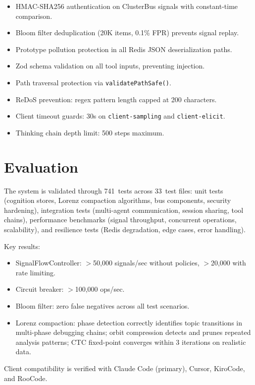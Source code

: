 \documentclass[journal,10pt]{IEEEtran}
\newcommand{\code}[1]{\texttt{#1}}
\begin{document}
\begin{itemize}[nosep]
\item HMAC-SHA256 authentication on ClusterBus signals with constant-time comparison.
\item Bloom filter deduplication (20K items, 0.1\% FPR) prevents signal replay.
\item Prototype pollution protection in all Redis JSON deserialization paths.
\item Zod schema validation on all tool inputs, preventing injection.
\item Path traversal protection via \code{validatePathSafe()}.
\item ReDoS prevention: regex pattern length capped at 200 characters.
\item Client timeout guards: 30s on \code{client-sampling} and \code{client-elicit}.
\item Thinking chain depth limit: 500 steps maximum.
\end{itemize}

\section{Evaluation}
\label{sec:eval}

The system is validated through 741~tests across 33~test files: unit tests (cognition stores, Lorenz compaction algorithms, bus components, security hardening), integration tests (multi-agent communication, session sharing, tool chains), performance benchmarks (signal throughput, concurrent operations, scalability), and resilience tests (Redis degradation, edge cases, error handling).

Key results:
\begin{itemize}[nosep]
\item SignalFlowController: $>$50{,}000 signals/sec without policies, $>$20{,}000 with rate limiting.
\item Circuit breaker: $>$100{,}000 ops/sec.
\item Bloom filter: zero false negatives across all test scenarios.
\item Lorenz compaction: phase detection correctly identifies topic transitions in multi-phase debugging chains; orbit compression detects and prunes repeated analysis patterns; CTC fixed-point converges within 3 iterations on realistic data.
\end{itemize}

Client compatibility is verified with Claude Code (primary), Cursor, KiroCode, and RooCode.
\end{document}

